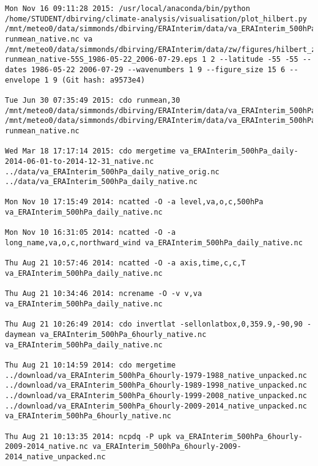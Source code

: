  
 \begin{featurebox}

\begin{tcolorbox}[width=\textwidth]

\begin{lstlisting}[basicstyle=\footnotesize\ttfamily, breaklines=true]
Mon Nov 16 09:11:28 2015: /usr/local/anaconda/bin/python /home/STUDENT/dbirving/climate-analysis/visualisation/plot_hilbert.py /mnt/meteo0/data/simmonds/dbirving/ERAInterim/data/va_ERAInterim_500hPa_030day-runmean_native.nc va /mnt/meteo0/data/simmonds/dbirving/ERAInterim/data/zw/figures/hilbert_zw_w19_va_ERAInterim_500hPa_030day-runmean_native-55S_1986-05-22_2006-07-29.eps 1 2 --latitude -55 -55 --dates 1986-05-22 2006-07-29 --wavenumbers 1 9 --figure_size 15 6 --envelope 1 9 (Git hash: a9573e4)

Tue Jun 30 07:35:49 2015: cdo runmean,30 /mnt/meteo0/data/simmonds/dbirving/ERAInterim/data/va_ERAInterim_500hPa_daily_native.nc /mnt/meteo0/data/simmonds/dbirving/ERAInterim/data/va_ERAInterim_500hPa_030day-runmean_native.nc

Wed Mar 18 17:17:14 2015: cdo mergetime va_ERAInterim_500hPa_daily-2014-06-01-to-2014-12-31_native.nc ../data/va_ERAInterim_500hPa_daily_native_orig.nc ../data/va_ERAInterim_500hPa_daily_native.nc

Mon Nov 10 17:15:49 2014: ncatted -O -a level,va,o,c,500hPa va_ERAInterim_500hPa_daily_native.nc

Mon Nov 10 16:31:05 2014: ncatted -O -a long_name,va,o,c,northward_wind va_ERAInterim_500hPa_daily_native.nc

Thu Aug 21 10:57:46 2014: ncatted -O -a axis,time,c,c,T va_ERAInterim_500hPa_daily_native.nc

Thu Aug 21 10:34:46 2014: ncrename -O -v v,va va_ERAInterim_500hPa_daily_native.nc

Thu Aug 21 10:26:49 2014: cdo invertlat -sellonlatbox,0,359.9,-90,90 -daymean va_ERAInterim_500hPa_6hourly_native.nc va_ERAInterim_500hPa_daily_native.nc

Thu Aug 21 10:14:59 2014: cdo mergetime ../download/va_ERAInterim_500hPa_6hourly-1979-1988_native_unpacked.nc ../download/va_ERAInterim_500hPa_6hourly-1989-1998_native_unpacked.nc ../download/va_ERAInterim_500hPa_6hourly-1999-2008_native_unpacked.nc ../download/va_ERAInterim_500hPa_6hourly-2009-2014_native_unpacked.nc va_ERAInterim_500hPa_6hourly_native.nc

Thu Aug 21 10:13:35 2014: ncpdq -P upk va_ERAInterim_500hPa_6hourly-2009-2014_native.nc va_ERAInterim_500hPa_6hourly-2009-2014_native_unpacked.nc


\end{lstlisting}
\end{tcolorbox}
\end{featurebox}
